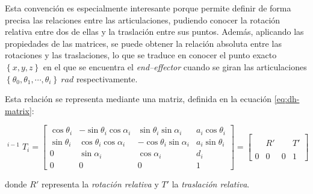 Esta convención es especialmente interesante porque permite definir de forma precisa
las relaciones entre las articulaciones, pudiendo conocer la rotación relativa entre
dos de ellas y la traslación entre sus puntos. Además, aplicando las propiedades
de las matrices, se puede obtener la relación absoluta entre las rotaciones y las
traslaciones, lo que se traduce en conocer el punto exacto $\left\{x, y, z\right\}$ en el que se encuentra el
\textit{end--effector} cuando se giran las articulaciones
$\left\{\theta_0, \theta_1, \cdots, \theta_i\right\}~rad$ respectivamente.

Esta relación se representa mediante una matriz, definida en la ecuación \ref{eq:dh-matrix}:

\begin{equation}
    \label{eq:dh-matrix}
    {
    \displaystyle \operatorname {}
    ^{i-1}T_{i}=\left[{
                \begin{array}{ccc|c}
                    \cos{\theta_{i}} & -\sin{\theta_{i}}\cos{\alpha_{i}} & \sin{\theta_{i}}\sin{\alpha_{i}}  & a_{i}\cos{\theta_{i}} \\
                    \sin{\theta_{i}} & \cos{\theta_{i}}\cos{\alpha_{i}}  & -\cos{\theta_{i}}\sin{\alpha_{i}} & a_{i}\sin{\theta_{i}} \\
                    0                & \sin{\alpha_{i}}                  & \cos{\alpha_{i}}                  & d_{i}                 \\
                    \hline
                    0                & 0                                 & 0                                 & 1
                \end{array}}\right] =
    \left[{
                \begin{array}{ccc|c}
                      &   &   &   \\
                      & R' &   & T' \\
                      &   &   &   \\
                    \hline
                    0 & 0 & 0 & 1
                \end{array}}
        \right]
    }
\end{equation}

donde $R'$ representa la \textit{rotación relativa} y $T'$ la \textit{traslación relativa}.

